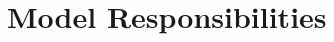 \documentclass[aspectratio=169,10pt]{beamer}
\begin{document}




\section{Model Responsibilities}
\end{document}
